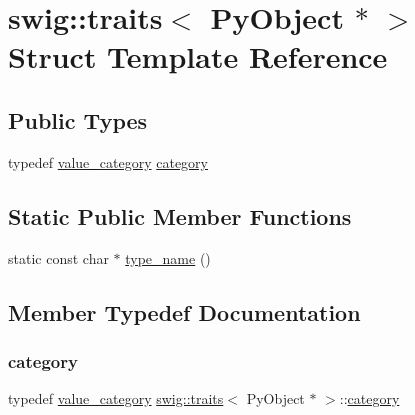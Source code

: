 \hypertarget{structswig_1_1traits_3_01_py_object_01_5_01_4}{}\section{swig\+:\+:traits$<$ Py\+Object $\ast$ $>$ Struct Template Reference}
\label{structswig_1_1traits_3_01_py_object_01_5_01_4}
\subsection*{Public Types}
\begin{DoxyCompactItemize}
\item 
typedef \hyperlink{structswig_1_1value__category}{value\+\_\+category} \hyperlink{structswig_1_1traits_3_01_py_object_01_5_01_4_a61e2b13476996b055b368fe035b84efc}{category}
\end{DoxyCompactItemize}
\subsection*{Static Public Member Functions}
\begin{DoxyCompactItemize}
\item 
static const char $\ast$ \hyperlink{structswig_1_1traits_3_01_py_object_01_5_01_4_a0d02bab40318920cce95270a10e465cd}{type\+\_\+name} ()
\end{DoxyCompactItemize}


\subsection{Member Typedef Documentation}
\mbox{\label{structswig_1_1traits_3_01_py_object_01_5_01_4_a61e2b13476996b055b368fe035b84efc}} 
\subsubsection{\texorpdfstring{category}{category}}
{\footnotesize\ttfamily typedef \hyperlink{structswig_1_1value__category}{value\+\_\+category} \hyperlink{structswig_1_1traits}{swig\+::traits}$<$ Py\+Object $\ast$ $>$\+::\hyperlink{structswig_1_1traits_3_01_py_object_01_5_01_4_a61e2b13476996b055b368fe035b84efc}{category}}




